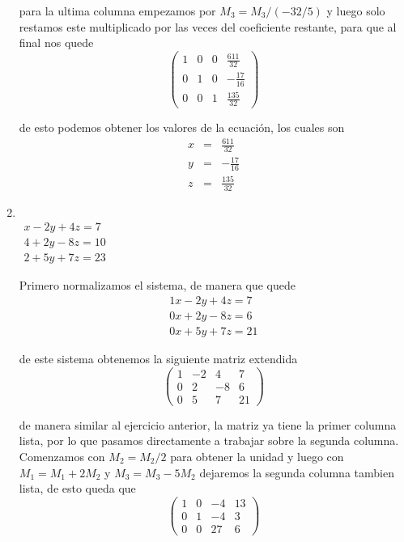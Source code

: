 \documentclass[11pt]{article}
\begin{document}
\begin{multicols}{2}
\begin{enumerate}[\bf{Sistema} 1]
			para la ultima columna empezamos por $M_3 = M_3/(-32/5)$ y luego solo restamos este multiplicado por las veces del coeficiente restante, para que al final nos quede
			$$\left(\begin{array}{rrrr}
				1 & 0 & 0 & \frac{611}{32} \\
				0 & 1 & 0 & -\frac{17}{16} \\
				0 & 0 & 1 & \frac{135}{32}
			\end{array}\right)$$
			
			de esto podemos obtener los valores de la ecuaci\'on, los cuales son
			\begin{eqnarray*}
				x &=& \frac{611}{32} \\
				y &=&-\frac{ 17}{16} \\
				z &=& \frac{135}{32}
			\end{eqnarray*}	

		\item
			\ \\ $\begin{matrix}
				x - 2y + 4z =  7 \\
				4 + 2y - 8z = 10 \\
				2 + 5y + 7z = 23
			\end{matrix}$
			
			\par Primero normalizamos el sistema, de manera que quede		
			$$\begin{matrix}
				1x - 2y + 4z =  7 \\
				0x + 2y - 8z =  6 \\
				0x + 5y + 7z = 21
			\end{matrix}$$
			
			de este sistema obtenemos la siguiente matriz extendida
			$$\left(\begin{array}{rrrr}
				1 & -2 & 4 & 7 \\
				0 & 2 & -8 & 6 \\
				0 & 5 & 7 & 21
			\end{array}\right)$$

			de manera similar al ejercicio anterior, la matriz ya tiene la primer columna lista, por lo que pasamos directamente a trabajar sobre la segunda columna. Comenzamos con $M_2 = M_2/2$ para obtener la unidad y luego con $M_1 = M_1 + 2 M_2$ y $M_3 = M_3 - 5 M_2$ dejaremos la segunda columna tambien lista, de esto queda que
			$$\left(\begin{array}{rrrr}
				1 & 0 & -4 & 13 \\
				0 & 1 & -4 & 3 \\
				0 & 0 & 27 & 6
			\end{array}\right)$$ 
			

\end{enumerate}
\end{multicols}
\end{document}
